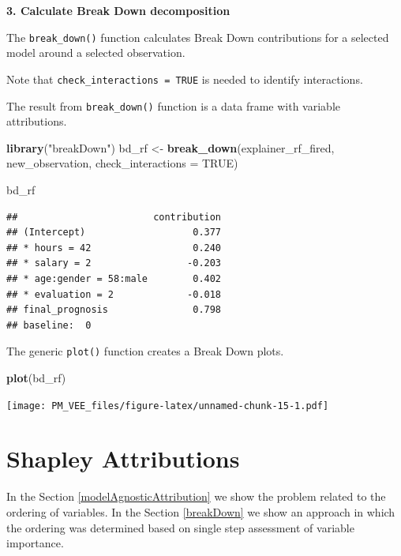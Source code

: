 \documentclass[]{book}
\newenvironment{Shaded}{\begin{snugshade}}{\end{snugshade}}
\newcommand{\DataTypeTok}[1]{\textcolor[rgb]{0.13,0.29,0.53}{#1}}
\newcommand{\KeywordTok}[1]{\textcolor[rgb]{0.13,0.29,0.53}{\textbf{#1}}}
\newcommand{\NormalTok}[1]{#1}
\newcommand{\OtherTok}[1]{\textcolor[rgb]{0.56,0.35,0.01}{#1}}
\newcommand{\StringTok}[1]{\textcolor[rgb]{0.31,0.60,0.02}{#1}}
\theoremstyle{definition}
\theoremstyle{definition}
\theoremstyle{definition}
\theoremstyle{remark}
\begin{document}
\textbf{3. Calculate Break Down decomposition}

The \texttt{break\_down()} function calculates Break Down contributions
for a selected model around a selected observation.

Note that \texttt{check\_interactions\ =\ TRUE} is needed to identify
interactions.

The result from \texttt{break\_down()} function is a data frame with
variable attributions.

\begin{Shaded}
\begin{Highlighting}[]
\KeywordTok{library}\NormalTok{(}\StringTok{"breakDown"}\NormalTok{)}
\NormalTok{bd_rf <-}\StringTok{ }\KeywordTok{break_down}\NormalTok{(explainer_rf_fired,}
\NormalTok{                 new_observation,}
                 \DataTypeTok{check_interactions =} \OtherTok{TRUE}\NormalTok{)}

\NormalTok{bd_rf}
\end{Highlighting}
\end{Shaded}

\begin{verbatim}
##                        contribution
## (Intercept)                   0.377
## * hours = 42                  0.240
## * salary = 2                 -0.203
## * age:gender = 58:male        0.402
## * evaluation = 2             -0.018
## final_prognosis               0.798
## baseline:  0
\end{verbatim}

The generic \texttt{plot()} function creates a Break Down plots.

\begin{Shaded}
\begin{Highlighting}[]
\KeywordTok{plot}\NormalTok{(bd_rf) }
\end{Highlighting}
\end{Shaded}

\texttt{[image: PM\_VEE\_files/figure-latex/unnamed-chunk-15-1.pdf]}

\hypertarget{shapley}{%
\chapter{Shapley Attributions}\label{shapley}}

In the Section \ref{modelAgnosticAttribution} we show the problem
related to the ordering of variables. In the Section \ref{breakDown} we
show an approach in which the ordering was determined based on single
step assessment of variable importance.
\end{document}
